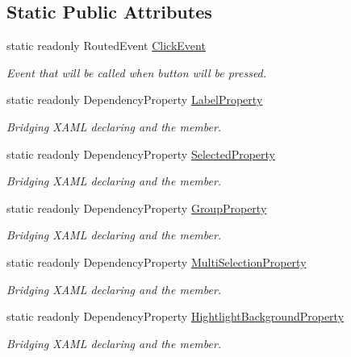\subsection*{Static Public Attributes}
\begin{DoxyCompactItemize}
\item 
static readonly Routed\+Event \mbox{\hyperlink{class_wpf_handler_1_1_u_i_1_1_controls_1_1_selectable_flat_button_a1988a63005ceaa7f7f07d1d44a7ae01f}{Click\+Event}}
\begin{DoxyCompactList}\small\item\em Event that will be called when button will be pressed. \end{DoxyCompactList}\item 
static readonly Dependency\+Property \mbox{\hyperlink{class_wpf_handler_1_1_u_i_1_1_controls_1_1_selectable_flat_button_afecdba1a6a477d574f423cc47ded74f7}{Label\+Property}}
\begin{DoxyCompactList}\small\item\em Bridging X\+A\+ML declaring and the member. \end{DoxyCompactList}\item 
static readonly Dependency\+Property \mbox{\hyperlink{class_wpf_handler_1_1_u_i_1_1_controls_1_1_selectable_flat_button_a8fcdfa5d44a6463e1c0296250fa260c9}{Selected\+Property}}
\begin{DoxyCompactList}\small\item\em Bridging X\+A\+ML declaring and the member. \end{DoxyCompactList}\item 
static readonly Dependency\+Property \mbox{\hyperlink{class_wpf_handler_1_1_u_i_1_1_controls_1_1_selectable_flat_button_a7263ef5d414587ec40f35ab3616173e4}{Group\+Property}}
\begin{DoxyCompactList}\small\item\em Bridging X\+A\+ML declaring and the member. \end{DoxyCompactList}\item 
static readonly Dependency\+Property \mbox{\hyperlink{class_wpf_handler_1_1_u_i_1_1_controls_1_1_selectable_flat_button_a5765829144f2d6ff2f76b972940ec242}{Multi\+Selection\+Property}}
\begin{DoxyCompactList}\small\item\em Bridging X\+A\+ML declaring and the member. \end{DoxyCompactList}\item 
static readonly Dependency\+Property \mbox{\hyperlink{class_wpf_handler_1_1_u_i_1_1_controls_1_1_selectable_flat_button_afc8f06c4a5fab3f5d259a250910ace6e}{Hightlight\+Background\+Property}}
\begin{DoxyCompactList}\small\item\em Bridging X\+A\+ML declaring and the member. \end{DoxyCompactList}\end{DoxyCompactItemize}
